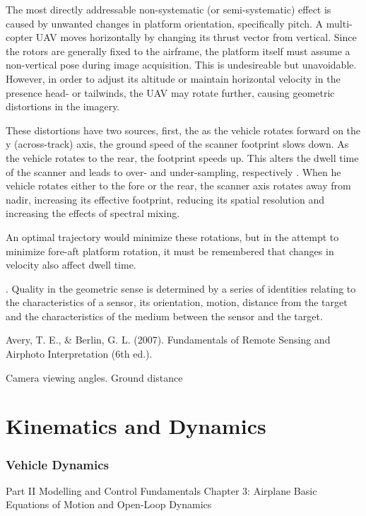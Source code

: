 \documentclass[10pt]{article}
\begin{document}
The most directly addressable non-systematic (or semi-systematic) effect is caused by unwanted changes in platform orientation, specifically pitch. A multi-copter UAV moves horizontally by changing its thrust vector from vertical. Since the rotors are generally fixed to the airframe, the platform itself must assume a non-vertical pose during image acquisition. This is undesireable but unavoidable. However, in order to adjust its altitude or maintain horizontal velocity in the presence head- or tailwinds, the UAV may rotate further, causing geometric distortions in the imagery. 

These distortions have two sources, first, the as the vehicle rotates forward on the y (across-track) axis, the ground speed of the scanner footprint slows down. As the vehicle rotates to the rear, the footprint speeds up. This alters the dwell time of the scanner and leads to over- and under-sampling, respectively \cite{Gupta2018}. When he vehicle rotates either to the fore or the rear, the scanner axis rotates away from nadir, increasing its effective footprint, reducing its spatial resolution \cite{Gupta2018} and increasing the effects of spectral mixing. 

An optimal trajectory would minimize these rotations, but in the attempt to minimize fore-aft platform rotation, it must be remembered that changes in velocity also affect dwell time.




 \cite{Gupta2018}. 
Quality in the geometric sense is determined by a series of identities relating to the characteristics of a sensor, its orientation, motion, distance from the target and the characteristics of the medium between the sensor and the target.

\cite{Avery2007}
Avery, T. E., \& Berlin, G. L. (2007). Fundamentals of Remote Sensing and Airphoto Interpretation (6th ed.).

Camera viewing angles.
Ground distance


\section{Kinematics and Dynamics}

\subsubsection{Vehicle Dynamics}

\cite{Valavanis2007}

Part II Modelling and Control Fundamentals
Chapter 3: Airplane Basic Equations of Motion and Open-Loop Dynamics
\end{document}
